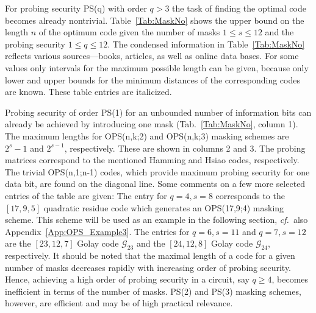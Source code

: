 \documentclass[11pt]{llncs}
\newcommand{\cf}{{\it cf.\ }}
\begin{document}
For probing security PS(q) with order $q > 3$
the task of finding the optimal code becomes already nontrivial.
Table~\ref{Tab:MaskNo} shows the upper bound on the length $n$ of the
optimum code given the number of masks $1 \le s \le 12$
and the probing security $1 \le q \le 12$.
The condensed information in Table~\ref{Tab:MaskNo} reflects various
sources---books, articles, as well as online data bases.
For some values only intervals for the
maximum possible length can be given,
because only lower and upper bounds for the minimum
distances of the corresponding codes are known.
These table entries are italicized.

Probing security of order PS(1) for an unbounded number of
information bits can already be achieved by introducing one mask
(Tab.~\ref{Tab:MaskNo}, column 1).
The maximum lengths for OPS(n,k;2) and OPS(n,k;3) masking schemes
are $2^{s}-1$ and $2^{s-1}$, respectively.
These are shown in columns 2 and 3.
The probing matrices correspond to the mentioned Hamming and Hsiao codes, respectively.
The trivial OPS(n,1;n-1) codes, which provide maximum probing security for one data bit,
are found on the diagonal line.
Some comments on a few more selected entries of the table are given:
The entry for $q=4,s=8$ corresponds to the $[17,9,5]$ quadratic
residue code which generates an OPS(17,9;4)
masking scheme. This scheme will be used as an example in the following section,
\cf also Appendix~\ref{App:OPS_Example3}.
The entries for $q=6,s=11$ and $q=7,s=12$ are
the $[23,12,7]$ Golay code $\mathcal G_{23}$ and
the $[24,12,8]$ Golay code $\mathcal G_{24}$, respectively.
It should be noted that the maximal length of a code for a given number of masks
decreases rapidly with increasing order of probing security.
Hence, achieving a high order of probing security in a circuit,
say $q \ge 4$, becomes inefficient in terms of the number of masks.
PS(2) and PS(3) masking schemes, however, are efficient and
may be of high practical relevance.
\end{document}
